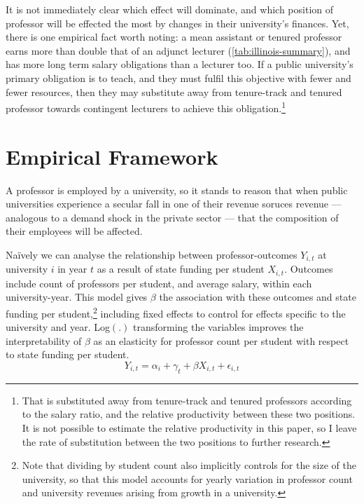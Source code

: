\documentclass[notitlepage,12pt]{article}
\begin{document}
It is not immediately clear which effect will dominate, and which position of professor will be effected the most by changes in their university's finances.
Yet, there is one empirical fact worth noting: a mean assistant or tenured professor earns more than double that of an adjunct lecturer (\autoref{tab:illinois-summary}), and has more long term salary obligations than a lecturer too.
If a public university's primary obligation is to teach, and they must fulfil this objective with fewer and fewer resources, then they may substitute away from tenure-track and tenured professor towards contingent lecturers to achieve this obligation.\footnote{
    That is substituted away from tenure-track and tenured professors according to the salary ratio, and the relative productivity between these two positions.
    It is not possible to estimate the relative productivity in this paper, so I leave the rate of substitution between the two positions to further research.
}


\section{Empirical Framework}
\label{sec:empirics}

A professor is employed by a university, so it stands to reason that when public universities experience a secular fall in one of their revenue soruces revenue --- analogous to a demand shock in the private sector --- that the composition of their employees will be affected.

Na\"ively we can analyse the relationship between professor-outcomes $Y_{i,t}$ at university $i$ in year $t$ as a result of state funding per student $X_{i,t}$.
Outcomes include count of professors per student, and average salary, within each university-year.
This model gives $\beta$ the association with these outcomes and state funding per student,\footnote{
    Note that dividing by student count also implicitly controls for the size of the university, so that this model accounts for yearly variation in professor count and university revenues arising from growth in a university.
}
including fixed effects to control for effects specific to the university and year.
Log$(.)$ transforming the variables improves the interpretability of $\beta$ as an elasticity for professor count per student with respect to state funding per student.
\begin{equation}
    \label{eqn:naivereg}
    Y_{i,t} = \alpha_i + \gamma_t + \beta X_{i,t} + \epsilon_{i,t}
\end{equation}
\end{document}
